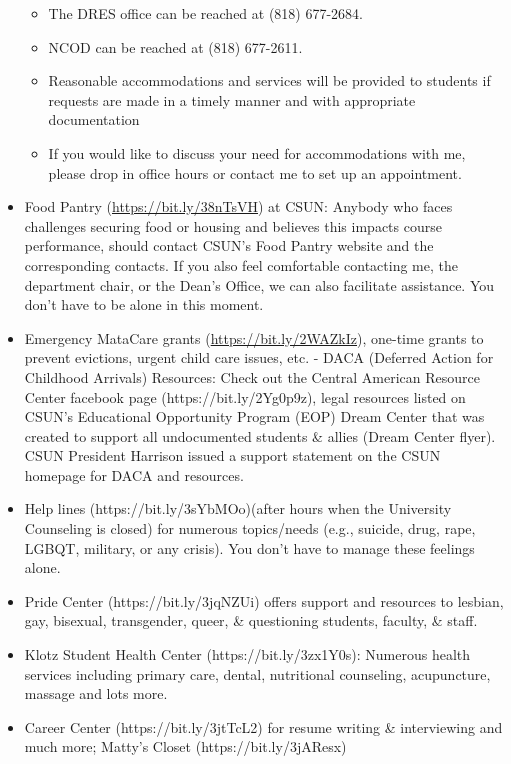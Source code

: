 \documentclass[
  letterpaper,
  DIV=11,
  numbers=noendperiod]{scrartcl}
\providecommand{\tightlist}{%
  \setlength{\itemsep}{0pt}\setlength{\parskip}{0pt}}\usepackage{longtable,booktabs,array}
\begin{document}
\begin{itemize}
  \begin{itemize}
  \tightlist
  \item
    The DRES office can be reached at (818) 677-2684.
  \item
    NCOD can be reached at (818) 677-2611.
  \item
    Reasonable accommodations and services will be provided to students
    if requests are made in a timely manner and with appropriate
    documentation
  \item
    If you would like to discuss your need for accommodations with me,
    please drop in office hours or contact me to set up an appointment.
  \end{itemize}
\item
  Food Pantry (\url{https://bit.ly/38nTsVH}) at CSUN: Anybody who faces
  challenges securing food or housing and believes this impacts course
  performance, should contact CSUN's Food Pantry website and the
  corresponding contacts. If you also feel comfortable contacting me,
  the department chair, or the Dean's Office, we can also facilitate
  assistance. You don't have to be alone in this moment.
\item
  Emergency MataCare grants (\url{https://bit.ly/2WAZkIz}), one-time
  grants to prevent evictions, urgent child care issues, etc. - DACA
  (Deferred Action for Childhood Arrivals) Resources: Check out the
  Central American Resource Center facebook page
  (https://bit.ly/2Yg0p9z), legal resources listed on CSUN's Educational
  Opportunity Program (EOP) Dream Center that was created to support all
  undocumented students \& allies (Dream Center flyer). CSUN President
  Harrison issued a support statement on the CSUN homepage for DACA and
  resources.
\item
  Help lines (https://bit.ly/3sYbMOo)(after hours when the University
  Counseling is closed) for numerous topics/needs (e.g., suicide, drug,
  rape, LGBQT, military, or any crisis). You don't have to manage these
  feelings alone.
\item
  Pride Center (https://bit.ly/3jqNZUi) offers support and resources to
  lesbian, gay, bisexual, transgender, queer, \& questioning students,
  faculty, \& staff.
\item
  Klotz Student Health Center (https://bit.ly/3zx1Y0s): Numerous health
  services including primary care, dental, nutritional counseling,
  acupuncture, massage and lots more.
\item
  Career Center (https://bit.ly/3jtTcL2) for resume writing \&
  interviewing and much more; Matty's Closet (https://bit.ly/3jAResx)

\end{itemize}
\end{document}
